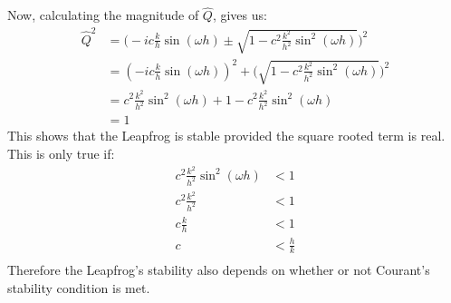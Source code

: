Now, calculating the magnitude of $\hat{Q}$, gives us:
\begin{align*}
    \hat{Q}^2 	& = \bigg(-i c\frac{k}{h} \sin( \omega h ) \pm \sqrt{1 -c^2\frac{k^2}{h^2} \sin^2( \omega h )}\bigg)^2	\\
		& = (-i c\frac{k}{h} \sin( \omega h ))^2 + \bigg(\sqrt{1 -c^2\frac{k^2}{h^2} \sin^2( \omega h )}\bigg)^2\\
		& = c^2\frac{k^2}{h^2} \sin^2( \omega h ) + 1 -c^2\frac{k^2}{h^2} \sin^2( \omega h )			\\
		& = 1
\end{align*}
This shows that the Leapfrog is stable provided the square rooted term is real. This is only true if:
\begin{equation*}
\begin{aligned}
    c^2\frac{k^2}{h^2} \sin^2( \omega h ) &< 1	\\
    c^2\frac{k^2}{h^2}  &< 1			\\
    c\frac{k}{h}  &< 1				\\
    c &< \frac{h}{k}				\\
\end{aligned}
\end{equation*}
Therefore the Leapfrog's stability also depends on whether or not Courant's stability condition is met.
